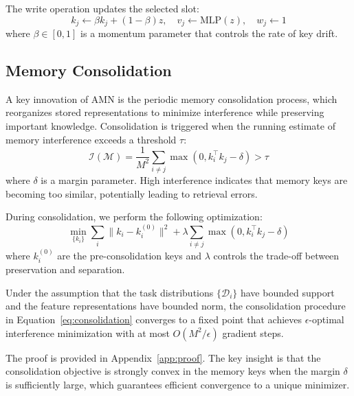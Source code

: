 \documentclass[11pt]{article}
\begin{document}
The write operation updates the selected slot:
\begin{equation}
    k_j \leftarrow \beta k_j + (1 - \beta) z, \quad v_j \leftarrow \text{MLP}(z), \quad w_j \leftarrow 1
\end{equation}
where $\beta \in [0, 1]$ is a momentum parameter that controls the rate of key drift.

\subsection{Memory Consolidation}
\label{sec:consolidation}

A key innovation of AMN is the periodic memory consolidation process, which reorganizes stored representations to minimize interference while preserving important knowledge. Consolidation is triggered when the running estimate of memory interference exceeds a threshold $\tau$:
\begin{equation}
    \mathcal{I}(\mathcal{M}) = \frac{1}{M^2} \sum_{i \neq j} \max(0, k_i^\top k_j - \delta) > \tau
\end{equation}
where $\delta$ is a margin parameter. High interference indicates that memory keys are becoming too similar, potentially leading to retrieval errors.

During consolidation, we perform the following optimization:
\begin{equation}
    \min_{\{k_i\}} \sum_{i} \|k_i - k_i^{(0)}\|^2 + \lambda \sum_{i \neq j} \max(0, k_i^\top k_j - \delta)
    \label{eq:consolidation}
\end{equation}
where $k_i^{(0)}$ are the pre-consolidation keys and $\lambda$ controls the trade-off between preservation and separation.

\begin{theorem}
\label{thm:convergence}
Under the assumption that the task distributions $\{\mathcal{D}_i\}$ have bounded support and the feature representations have bounded norm, the consolidation procedure in Equation~\ref{eq:consolidation} converges to a fixed point that achieves $\epsilon$-optimal interference minimization with at most $O(M^2 / \epsilon)$ gradient steps.
\end{theorem}

The proof is provided in Appendix~\ref{app:proof}. The key insight is that the consolidation objective is strongly convex in the memory keys when the margin $\delta$ is sufficiently large, which guarantees efficient convergence to a unique minimizer.
\end{document}
